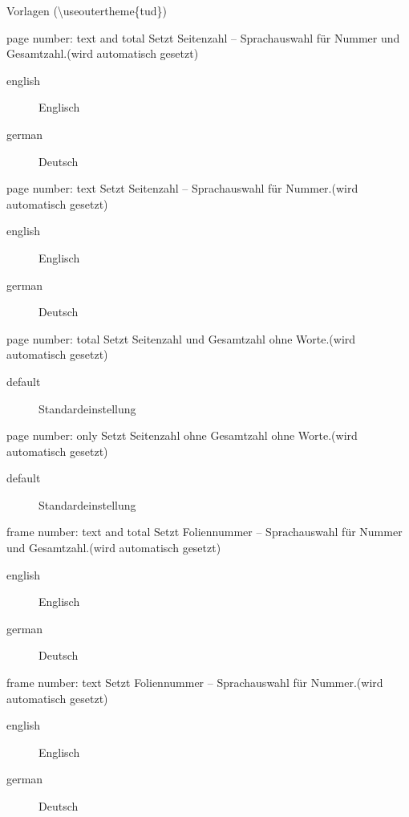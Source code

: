 \documentclass[presentation,t]{beamer}
\begin{document}
\begin{frame}[allowframebreaks]{Vorlagen (\textbackslash useoutertheme\{tud\})}
\begin{block}{page number: text and total}
Setzt Seitenzahl – Sprachauswahl für Nummer und Gesamtzahl.(wird automatisch gesetzt)
\begin{description}
\item[{english}] Englisch
\item[{german}] Deutsch
\end{description}
\end{block}

\begin{block}{page number: text}
Setzt Seitenzahl – Sprachauswahl für Nummer.(wird automatisch gesetzt)
\begin{description}
\item[{english}] Englisch
\item[{german}] Deutsch
\end{description}
\end{block}

\begin{block}{page number: total}
Setzt Seitenzahl und Gesamtzahl ohne Worte.(wird automatisch gesetzt)
\begin{description}
\item[{default}] Standardeinstellung
\end{description}
\end{block}

\begin{block}{page number: only}
Setzt Seitenzahl ohne Gesamtzahl ohne Worte.(wird automatisch gesetzt)
\begin{description}
\item[{default}] Standardeinstellung
\end{description}
\end{block}

\begin{block}{frame number: text and total}
Setzt Foliennummer – Sprachauswahl für Nummer und Gesamtzahl.(wird automatisch gesetzt)
\begin{description}
\item[{english}] Englisch
\item[{german}] Deutsch
\end{description}
\end{block}

\begin{block}{frame number: text}
Setzt Foliennummer – Sprachauswahl für Nummer.(wird automatisch gesetzt)
\begin{description}
\item[{english}] Englisch
\item[{german}] Deutsch
\end{description}
\end{block}


\end{frame}
\end{document}
